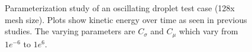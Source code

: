 \begin{figure}[htbp]
	\centering
	\caption{Parameterization study of an oscillating droplet test case (128x mesh size). Plots show kinetic energy over time as seen in previous studies. The varying parameters are $C_{\sigma}$ and $C_{\mu}$ which vary from $1e^{-6}$ to $1e^6$.}
	\label{fig:para2}
\end{figure}


